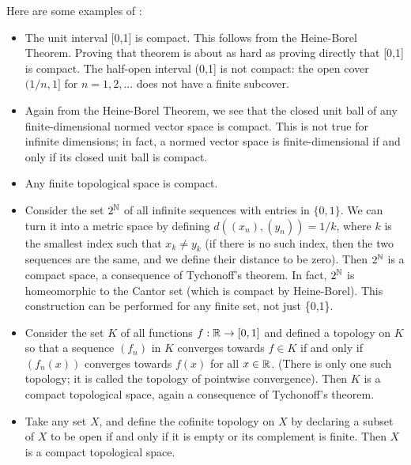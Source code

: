 \documentclass[12pt]{article}
\begin{document}

Here are some examples of :

\begin{itemize}

\item The unit interval [0,1] is compact. This follows from the Heine-Borel Theorem. Proving that theorem is about as hard as proving directly that [0,1] is compact. The half-open interval (0,1] is not compact: the open cover $(1/n, 1]$ for $n=1,2,...$ does not have a finite subcover.

\item Again from the Heine-Borel Theorem, we see that the closed unit ball of any finite-dimensional normed vector space is compact. This is not true for infinite dimensions; in fact, a normed vector space is finite-dimensional if and only if its closed unit ball is compact.

\item Any finite topological space is compact.

\item Consider the set $2^\Bbb{N}$ of all infinite sequences with entries in $\{0,1\}$. We can turn it into a metric space by defining $d((x_n),(y_n)) = 1/k$, where $k$ is the smallest index such that $x_k \not = y_k$ (if there is no such index, then the two sequences are the same, and we define their distance to be zero). Then $2^\Bbb{N}$ is a compact space, a consequence of Tychonoff's theorem. In fact, $2^\Bbb{N}$ is homeomorphic to the Cantor set (which is compact by Heine-Borel). This construction can be performed for any finite set, not just \{0,1\}.

\item Consider the set $K$ of all functions $f : \Bbb{R} \rightarrow [0,1]$ and defined a topology on $K$ so that a sequence $(f_n)$ in $K$ converges towards $f\in K$ if and only if $(f_n(x))$ converges towards $f(x)$ for all $x\in\Bbb{R}$.
(There is only one such topology; it is called the topology of pointwise convergence). Then $K$ is a compact topological space, again a consequence of Tychonoff's theorem.

\item Take any set $X$, and define the cofinite topology on $X$ by declaring a subset of $X$ to be open if and only if it is empty or its complement is finite. Then $X$ is a compact topological space.


\end{itemize}
\end{document}
